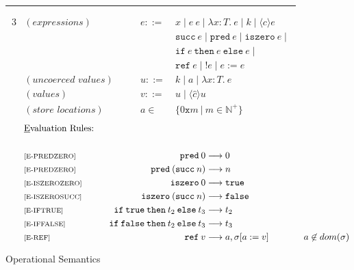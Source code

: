 \begin{figure}[ht!]
    \caption{Operational Semantics}
    \hrule
    \vspace{4mm}
    \qquad {}
    \begin{alignat*}{3}
        &(\textit{expressions}) \qquad 
        & e ::= \: & x \; | \;  
          e \: e \; | \;
          \lambda x \! : \! T . \: e \; | \;
          k \; | \; \langle c \rangle e\\
    &&    & \texttt{succ} \: e \; | \;
          \texttt{pred} \: e \; | \;
          \texttt{iszero} \: e \; | \; \\
    &&    & \texttt{if} \: e \: \texttt{then} \: e \: \texttt{else} \: e \; | \; \\
    &&    & \texttt{ref} \: e \; | \;
          !e \; | \;
          e := e \\
        &(\textit{uncoerced values}) \qquad
        & u ::= \: & k \; | \; a \; | \; \lambda x \! : \! T. \:e  \\
        &(\textit{values}) \qquad
        & v ::= \: & u \; | \; \langle \hat{c} \rangle u \\
        &(\textit{store locations}) \qquad
        & a \in \: & \{0 \texttt{x} m \: | \: m \in \mathbb{N}^+\}
    \end{alignat*}
    \begin{alignat*}{3}
        \qquad & \text{\underline{E}valuation Rules:} \\ \\
        & {\scriptsize{\text{[E-PREDZERO]}}} \qquad & \texttt{pred} \: 0 & \longrightarrow 0\\ 
        & {\scriptsize{\text{[E-PREDZERO]}}} \qquad & \texttt{pred} \: (\texttt{succ} \: n) & \longrightarrow n&\\
        & {\scriptsize{\text{[E-ISZEROZERO]}}} \qquad &\texttt{iszero} \: 0 & \longrightarrow \texttt{true} \\
        & {\scriptsize{\text{[E-ISZEROSUCC]}}} \qquad & \texttt{iszero} \: (\texttt{succ} \: n) & \longrightarrow \texttt{false} \\
        & {\scriptsize{\text{[E-IFTRUE]}}} \qquad & \texttt{if} \: \texttt{true} \: \texttt{then} \: t_2 \: \texttt{else} \: t_3 & \longrightarrow t_2 \\
        & {\scriptsize{\text{[E-IFFALSE]}}} \qquad & \texttt{if} \: \texttt{false} \: \texttt{then} \: t_2 \: \texttt{else} \: t_3 & \longrightarrow t_3 \\
        & {\scriptsize{\text{[E-REF]}}} \qquad & \texttt{ref} \: v & \longrightarrow a, \sigma[a := v] \hspace{1cm} & a \not \in dom(\sigma) \\

\end{alignat*}
\end{figure}
